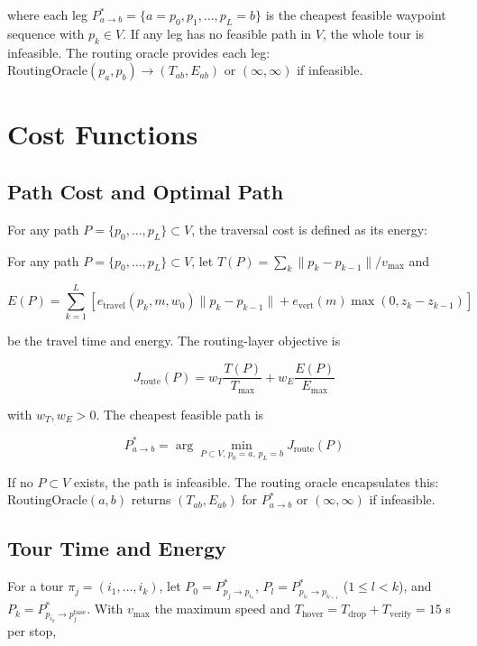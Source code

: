 \documentclass[conference]{IEEEtran}
\begin{document}
where each leg $P_{a\to b}^*=\{a=p_0,p_1,\dots,p_L=b\}$ is the cheapest feasible waypoint sequence with $p_k\in V$. If any leg has no feasible path in $V$, the whole tour is infeasible. The routing oracle provides each leg: $\text{RoutingOracle}(p_a,p_b)\to(T_{ab},E_{ab})$ or $(\infty,\infty)$ if infeasible.

\section{Cost Functions}

\subsection{Path Cost and Optimal Path}
For any path $P=\{p_0,\dots,p_L\}\subset V$, the traversal cost is defined as its energy:

For any path $P=\{p_0,\dots,p_L\}\subset V$, let $T(P)=\sum_{k}\|p_k-p_{k-1}\|/v_{\max}$ and

\begin{equation}
E(P)=\sum_{k=1}^{L}\left[e_{\text{travel}}(p_k,m,w_0)\|p_k-p_{k-1}\|+e_{\text{vert}}(m)\max(0,z_k-z_{k-1})\right]
\end{equation}

be the travel time and energy. The routing-layer objective is

\begin{equation}
J_{\text{route}}(P)=w_T\frac{T(P)}{T_{\max}}+w_E\frac{E(P)}{E_{\max}}
\label{eq:pathcost}
\end{equation}

with $w_T,w_E>0$. The cheapest feasible path is

\begin{equation}
P_{a\to b}^*=\arg\min_{P\subset V,\,p_0=a,\,p_L=b}J_{\text{route}}(P)
\label{eq:optpath}
\end{equation}

If no $P\subset V$ exists, the path is infeasible. The routing oracle encapsulates this: $\text{RoutingOracle}(a,b)$ returns $(T_{ab},E_{ab})$ for $P_{a\to b}^*$ or $(\infty,\infty)$ if infeasible.

\subsection{Tour Time and Energy}
For a tour $\pi_j=(i_1,\dots,i_k)$, let $P_0=P_{p_j\to p_{i_1}}^*$, $P_l=P_{p_{i_l}\to p_{i_{l+1}}}^*$ ($1\le l<k$), and $P_k=P_{p_{i_k}\to p_j^{\text{base}}}^*$. With $v_{\max}$ the maximum speed and $T_{\text{hover}}=T_{\text{drop}}+T_{\text{verify}}=15$ s per stop,
\end{document}

